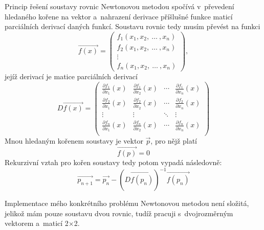 		Princip řešení soustavy rovnic Newtonovou metodou spočívá v~převedení hledaného kořene na vektor a~nahrazení derivace příšlušné funkce maticí parciálních derivací daných funkcí\cite{newton}. Soustavu rovnic tedy musím převést na funkci\cite{newton} 
		\begin{equation}
			\vec{f(x)}=
			\begin{pmatrix}
				f_1(x_1, x_2,~\hdots~, x_n) \\
				f_2(x_1, x_2,~\hdots~, x_n) \\
				\vdots	\\
				f_n(x_1, x_2,~\hdots~, x_n)
			\end{pmatrix},
		\end{equation}
		jejíž derivací je matice parciálních derivací\cite{newton}
		\begin{equation}
			D\vec{f(x)}=
			\begin{pmatrix}
			\frac{\partial f_1}{\partial x_1}(x) & \frac{\partial f_1}{\partial x_2}(x) & \cdots & \frac{\partial f_1}{\partial x_n}(x)\\
			\frac{\partial f_2}{\partial x_1}(x) & \frac{\partial f_2}{\partial x_2}(x) & \cdots & \frac{\partial f_2}{\partial x_n}(x)\\
			\vdots & \vdots & \ddots & \vdots\\
			\frac{\partial f_n}{\partial x_1}(x) & \frac{\partial f_n}{\partial x_2}(x) & \cdots & \frac{\partial f_n}{\partial x_n}(x)\\
			\end{pmatrix}
		\end{equation}
		Mnou hledaným kořenem soustavy je vektor $\vec{p}$, pro nějž platí\cite{newton}
		\begin{equation}
				\vec{f(p)}=0
		\end{equation}
		Rekurzivní vztah pro kořen soustavy tedy potom vypadá následovně\cite{newton}:
		\begin{equation}
			\vec{p_{n+1}}=\vec{p_n}-\left(D\vec{f(p_n)}\right)^{-1}\vec{f(p_n)}
		\end{equation}
		
		Implementace mého konkrétního problému Newtonovou metodou není složitá, jelikož mám pouze soustavu dvou rovnic, tudíž pracuji s~dvojrozměrným vektorem a~maticí 2$\times$2.
		
